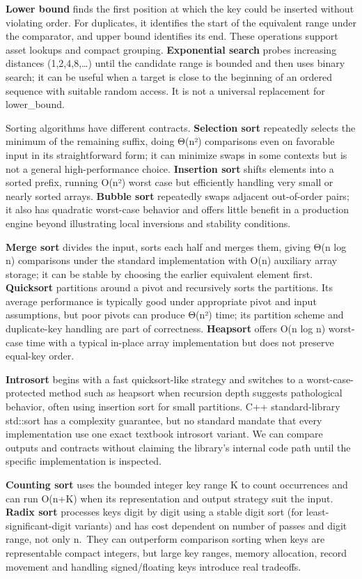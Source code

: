 \textbf{Lower bound} finds the first position at which the key could be inserted without violating order. For duplicates, it identifies the start of the equivalent range under the comparator, and upper bound identifies its end. These operations support asset lookups and compact grouping. \textbf{Exponential search} probes increasing distances (1,2,4,8,\ldots) until the candidate range is bounded and then uses binary search; it can be useful when a target is close to the beginning of an ordered sequence with suitable random access. It is not a universal replacement for lower\_bound.

Sorting algorithms have different contracts. \textbf{Selection sort} repeatedly selects the minimum of the remaining suffix, doing Θ(n²) comparisons even on favorable input in its straightforward form; it can minimize swaps in some contexts but is not a general high-performance choice. \textbf{Insertion sort} shifts elements into a sorted prefix, running O(n²) worst case but efficiently handling very small or nearly sorted arrays. \textbf{Bubble sort} repeatedly swaps adjacent out-of-order pairs; it also has quadratic worst-case behavior and offers little benefit in a production engine beyond illustrating local inversions and stability conditions.

\textbf{Merge sort} divides the input, sorts each half and merges them, giving Θ(n log n) comparisons under the standard implementation with O(n) auxiliary array storage; it can be stable by choosing the earlier equivalent element first. \textbf{Quicksort} partitions around a pivot and recursively sorts the partitions. Its average performance is typically good under appropriate pivot and input assumptions, but poor pivots can produce Θ(n²) time; its partition scheme and duplicate-key handling are part of correctness. \textbf{Heapsort} offers O(n log n) worst-case time with a typical in-place array implementation but does not preserve equal-key order.

\textbf{Introsort} begins with a fast quicksort-like strategy and switches to a worst-case-protected method such as heapsort when recursion depth suggests pathological behavior, often using insertion sort for small partitions. C++ standard-library std::sort has a complexity guarantee, but no standard mandate that every implementation use one exact textbook introsort variant. We can compare outputs and contracts without claiming the library's internal code path until the specific implementation is inspected.

\textbf{Counting sort} uses the bounded integer key range K to count occurrences and can run O(n+K) when its representation and output strategy suit the input. \textbf{Radix sort} processes keys digit by digit using a stable digit sort (for least-significant-digit variants) and has cost dependent on number of passes and digit range, not only n.~They can outperform comparison sorting when keys are representable compact integers, but large key ranges, memory allocation, record movement and handling signed/floating keys introduce real tradeoffs.

